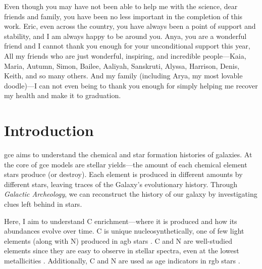 \documentclass[12pt,oneside,letterpaper]{report}
\newcommand{\agb}{\gls{agb}}
\newcommand{\gce}{\gls{gce}}
\newcommand{\Gce}{\Gls{gce}}
\begin{document}
Even though you may have not been able to help me with the science, dear friends and family, you have been no less important in the completion of this work. 
Eric, even across the country, you have always been a point of support and stability, and I am always happy to be around you. Anya, you are a wonderful friend and I cannot thank you enough for your unconditional support this year, 
All my friends who are just wonderful, inspiring, and incredible people---Kaia, Maria, Autumn, Simon, Bailee, Aaliyah, Sanskruti, Alyssa, Harrison, Denis, Keith, and so many others. 
And my family (including Arya, my most lovable doodle)---I can not even being to thank you enough for simply helping me recover my health and make it to graduation. 









\tableofcontents
\listoffigures
\listoftables
\newpage
{}









\chapter{Introduction}

\Gce{} aims to understand the chemical and star formation histories of galaxies. At the core of \gce{} models are stellar yields---the amount of each chemical element stars produce (or destroy). Each element is produced in different amounts by different stars, leaving traces of the Galaxy's evolutionary history. Through \textit{Galactic Archeology}, we can reconstruct the history of our galaxy by investigating clues left behind in stars.

Here, I aim to understand C enrichment---where it is produced and how its abundances evolve over time. C is unique nucleosynthetically, one of few light elements (along with N) produced in \agb{} stars \citep[e.g.][]{jennifer19, KL14}. C and N are well-studied elements since they are easy to observe in stellar spectra, even at the lowest metallicities \cite[e.g.][]{fabbian+09, nissen+14, lambert81, laird85, lambert86}. Additionally, C and N are used as age indicators in \gls{rgb} stars \citep{martig16, MG15, hasselquist19, vincenzo+21}.
\end{document}
